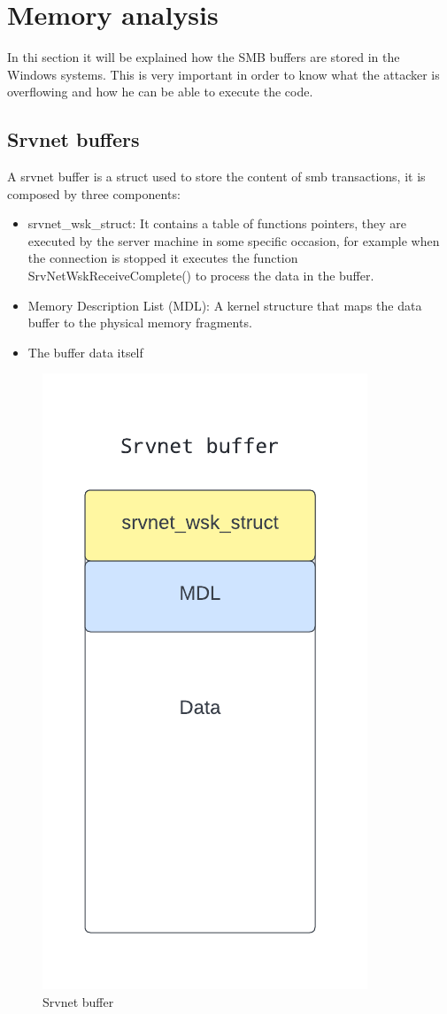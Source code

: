 \section{Memory analysis}
In thi section it will be explained how the SMB buffers are stored in the Windows systems. This is very important in order to know 
what the attacker is overflowing and how he can be able to execute the code.
\subsection{Srvnet buffers}
A srvnet buffer is a struct used to store the content of smb transactions, it is composed by three components:
\begin{itemize}
    \item srvnet\_wsk\_struct: It contains a table of functions pointers, they are executed by the server machine in some specific occasion, for example
    when the connection is stopped it executes the function SrvNetWskReceiveComplete() to process the data in the buffer.
    \item Memory Description List (MDL): A kernel structure that maps the data buffer to the physical memory fragments.
    \item The buffer data itself
\end{itemize}

\begin{figure}[ht!]
    \centering
      \includegraphics[]{images/srvnet_buffer.png}
      \caption{Srvnet buffer}
\end{figure}

